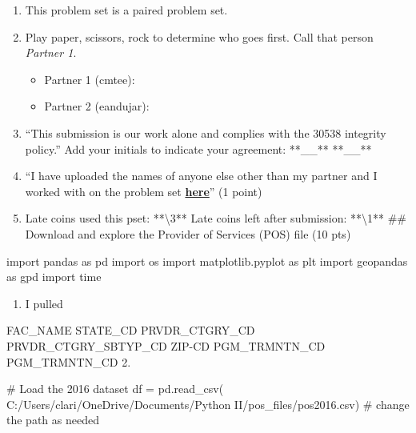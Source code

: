\documentclass[
  letterpaper,
  DIV=11,
  numbers=noendperiod]{scrartcl}
\newenvironment{Shaded}{\begin{snugshade}}{\end{snugshade}}
\newcommand{\CommentTok}[1]{\textcolor[rgb]{0.37,0.37,0.37}{#1}}
\newcommand{\ImportTok}[1]{\textcolor[rgb]{0.00,0.46,0.62}{#1}}
\newcommand{\NormalTok}[1]{\textcolor[rgb]{0.00,0.23,0.31}{#1}}
\newcommand{\OperatorTok}[1]{\textcolor[rgb]{0.37,0.37,0.37}{#1}}
\newcommand{\StringTok}[1]{\textcolor[rgb]{0.13,0.47,0.30}{#1}}
\providecommand{\tightlist}{%
  \setlength{\itemsep}{0pt}\setlength{\parskip}{0pt}}\usepackage{longtable,booktabs,array}
\begin{document}
\begin{enumerate}
\def\labelenumi{\arabic{enumi}.}
\tightlist
\item
  This problem set is a paired problem set.
\item
  Play paper, scissors, rock to determine who goes first. Call that
  person \emph{Partner 1}.

  \begin{itemize}
  \tightlist
  \item
    Partner 1 (cmtee):
  \item
    Partner 2 (eandujar):
  \end{itemize}
\item
  ``This submission is our work alone and complies with the 30538
  integrity policy.'' Add your initials to indicate your agreement:
  **\_\_** **\_\_**
\item
  ``I have uploaded the names of anyone else other than my partner and I
  worked with on the problem set
  \textbf{\href{https://docs.google.com/forms/d/185usrCREQaUbvAXpWhChkjghdGgmAZXA3lPWpXLLsts/edit}{here}}''
  (1 point)
\item
  Late coins used this pset: **\textbackslash3** Late coins left after
  submission: **\textbackslash1** \#\# Download and explore the Provider
  of Services (POS) file (10 pts)
\end{enumerate}

\begin{Shaded}
\begin{Highlighting}[]
\ImportTok{import}\NormalTok{ pandas }\ImportTok{as}\NormalTok{ pd}
\ImportTok{import}\NormalTok{ os}
\ImportTok{import}\NormalTok{ matplotlib.pyplot }\ImportTok{as}\NormalTok{ plt}
\ImportTok{import}\NormalTok{ geopandas }\ImportTok{as}\NormalTok{ gpd}
\ImportTok{import}\NormalTok{ time}
\end{Highlighting}
\end{Shaded}

\begin{enumerate}
\def\labelenumi{\arabic{enumi}.}
\tightlist
\item
  I pulled
\end{enumerate}

FAC\_NAME STATE\_CD PRVDR\_CTGRY\_CD PRVDR\_CTGRY\_SBTYP\_CD ZIP-CD
PGM\_TRMNTN\_CD PGM\_TRMNTN\_CD 2.

\begin{Shaded}
\begin{Highlighting}[]
\CommentTok{\# Load the 2016 dataset}
\NormalTok{df }\OperatorTok{=}\NormalTok{ pd.read\_csv(}
    \StringTok{\textquotesingle{}C:/Users/clari/OneDrive/Documents/Python II/pos\_files/pos2016.csv\textquotesingle{}}\NormalTok{)}
\CommentTok{\# change the path as needed}
\end{Highlighting}
\end{Shaded}
\end{document}
